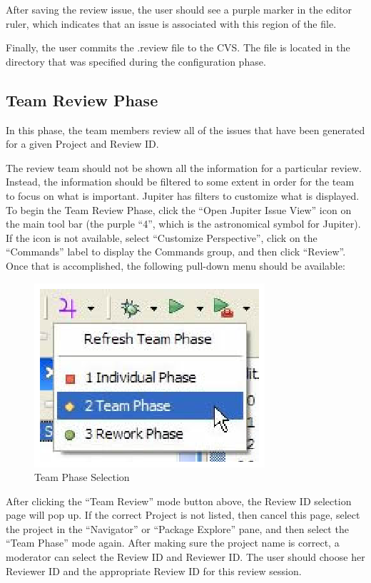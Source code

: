 After saving the review issue, the user should see a purple marker in the editor ruler, which indicates that an issue is associated with this region of the file.

Finally, the user commits the .review file to the CVS. The file is located in the directory that was specified during the configuration phase.

\subsection{Team Review Phase}
\label{subsec:team-review-phase}

In this phase, the team members review all of the issues that have been generated for a given Project and Review ID.

The review team should not be shown all the information for a particular review. Instead, the information should be filtered to some extent in order for the team to focus on what is important. Jupiter has filters to customize what is displayed. To begin the Team Review Phase, click the ``Open Jupiter Issue View'' icon on the main tool bar (the purple ``4'', which is the astronomical symbol for Jupiter). If the icon is not available, select ``Customize Perspective'', click on the ``Commands'' label to display the Commands group, and then click ``Review''. Once that is accomplished, the following pull-down menu should be available:

\begin{figure}[htbp]
  \centering
  \includegraphics{images/fig3-28.eps}
  \caption{Team Phase Selection}
  \label{fig3-28}
\end{figure}

After clicking the ``Team Review'' mode button above, the Review ID selection page will pop up. If the correct Project is not listed, then cancel this page, select the project in the ``Navigator'' or ``Package Explore'' pane, and then select the ``Team Phase'' mode again. After making sure the project name is correct, a moderator can select the Review ID and Reviewer ID. The user should choose her Reviewer ID and the appropriate Review ID for this review session. 

